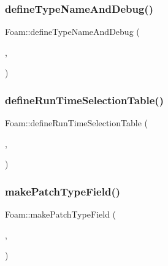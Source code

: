 \mbox{\label{namespaceFoam_ada2ef2212999a3b0fcf20c4c6e99e556}} 
\subsubsection{\texorpdfstring{define\+Type\+Name\+And\+Debug()}{defineTypeNameAndDebug()}\hspace{0.1cm}{\footnotesize\ttfamily [10/50]}}
{\footnotesize\ttfamily Foam\+::define\+Type\+Name\+And\+Debug (\begin{DoxyParamCaption}\item[{\hyperlink{classFoam_1_1thermalHydraulicsModel}{thermal\+Hydraulics\+Model}}]{,  }\item[{0}]{ }\end{DoxyParamCaption})}

\mbox{\label{namespaceFoam_a96db316811bbced71b7d20ace04527bf}} 
\subsubsection{\texorpdfstring{define\+Run\+Time\+Selection\+Table()}{defineRunTimeSelectionTable()}\hspace{0.1cm}{\footnotesize\ttfamily [4/28]}}
{\footnotesize\ttfamily Foam\+::define\+Run\+Time\+Selection\+Table (\begin{DoxyParamCaption}\item[{\hyperlink{classFoam_1_1thermalHydraulicsModel}{thermal\+Hydraulics\+Model}}]{,  }\item[{thermal\+Hydraulics\+Models}]{ }\end{DoxyParamCaption})}

\mbox{\label{namespaceFoam_a50b7735facab68b5459bf331fd593b98}} 
\subsubsection{\texorpdfstring{make\+Patch\+Type\+Field()}{makePatchTypeField()}\hspace{0.1cm}{\footnotesize\ttfamily [1/7]}}
{\footnotesize\ttfamily Foam\+::make\+Patch\+Type\+Field (\begin{DoxyParamCaption}\item[{fv\+Patch\+Scalar\+Field}]{,  }\item[{\hyperlink{classFoam_1_1timeFieldTableFvPatchScalarField}{time\+Field\+Table\+Fv\+Patch\+Scalar\+Field}}]{ }\end{DoxyParamCaption})}



